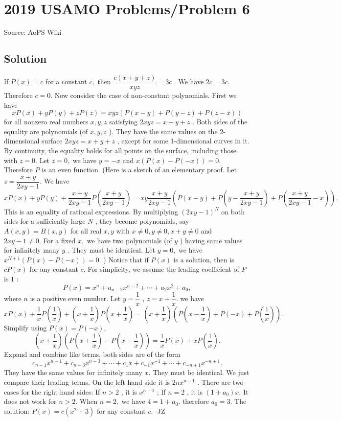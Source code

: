 \documentclass[12pt]{article}
\begin{document}
\section*{{2019 USAMO Problems/Problem 6}}
Source: AoPS Wiki

\subsection*{Solution}
If $P(x)=c$ for a constant $c,$ then $\dfrac{c(x+y+z)}{xyz}=3c$ . We have $2c=3c.$ Therefore $c=0.$ Now consider the case of non-constant polynomials.
First we have \[xP(x)+yP(y)+zP(z)=xyz(P(x-y)+P(y-z)+P(z-x))\] for all nonzero real numbers $x,y,z$ satisfying $2xyz=x+y+z$ . Both sides of the equality are polynomials (of $x,y,z$ ). They have the same values on the 2-dimensional surface $2xyz=x+y+z$ , except for some 1-dimensional curves in it. By continuity, the equality holds for all points on the surface, including those with $z=0.$ Let $z=0,$ we have $y=-x$ and $x(P(x)-P(-x))=0.$ Therefore $P$ is an even function. (Here is a sketch of an elementary proof. Let $z=\dfrac{x+y}{2xy-1}.$ We have \[xP(x)+yP(y)+\dfrac{x+y}{2xy-1}P(\dfrac{x+y}{2xy-1})=xy\dfrac{x+y}{2xy-1}(P(x-y)+P(y-\dfrac{x+y}{2xy-1})+P(\dfrac{x+y}{2xy-1}-x)).\] This is an equality of rational expressions. By multiplying $(2xy-1)^N$ on both sides for a sufficiently large $N$ , they become polynomials, say $A(x,y)=B(x,y)$ for all real $x, y$ with $x\ne 0, y\ne 0, x+y\ne 0$ and $2xy-1\ne 0.$ For a fixed $x,$ we have two polynomials (of $y$ ) having same values for infinitely many $y$ . They must be identical. Let $y=0,$ we have $x^{N+1}(P(x)-P(-x))=0.$ ) Notice that if $P(x)$ is a solution, then is $cP(x)$ for any constant $c.$ For simplicity, we assume the leading coefficient of $P$ is $1$ : \[P(x)=x^n+a_{n-2}x^{n-2}+\cdots +a_2x^2+a_0,\] where $n$ is a positive even number. Let $y=\dfrac{1}{x}$ , $z=x+\dfrac{1}{x}.$ we have \[xP(x)+\dfrac{1}{x}P\left (\dfrac{1}{x}\right )+\left ( x+\dfrac{1}{x}\right ) P\left ( x+\dfrac{1}{x}\right ) =\left (x+\dfrac{1}{x}\right )\left ( P\left (x-\dfrac{1}{x}\right )+P(-x)+P\left (\dfrac{1}{x}\right )\right ).\] Simplify using $P(x)=P(-x),$ \[\left (x+\dfrac{1}{x}\right ) \left (P\left (x+\dfrac{1}{x}\right )-P\left (x-\dfrac{1}{x}\right )\right )=\dfrac{1}{x}P(x)+xP\left (\dfrac{1}{x}\right ).\] Expand and combine like terms, both sides are of the form \[c_{n-1}x^{n-1}+c_{n-3}x^{n-3}+\cdots+c_1x+c_{-1}x^{-1}+\cdots+c_{-n+1}x^{-n+1}.\] They have the same values for infinitely many $x.$ They must be identical. We just compare their leading terms. On the left hand side it is $2nx^{n-1}$ . There are two cases for the right hand sides: If $n>2$ , it is $x^{n-1}$ ; If $n=2$ , it is $(1+a_0)x.$ It does not work for $n>2.$ When $n=2,$ we have $4=1+a_0.$ therefore $a_0=3.$ The solution: $P(x)=c(x^2+3)$ for any constant $c.$ -JZ
\end{document}
